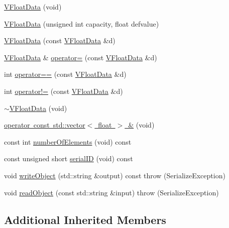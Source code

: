 \begin{DoxyCompactItemize}
\item 
\mbox{\hyperlink{classFILEDB_1_1VFloatData_a25f93b52c82fdc6299e386be3e251912}{V\+Float\+Data}} (void)
\item 
\mbox{\hyperlink{classFILEDB_1_1VFloatData_a27b94ed1e86096f64166bcd712b2ae94}{V\+Float\+Data}} (unsigned int capacity, float defvalue)
\item 
\mbox{\hyperlink{classFILEDB_1_1VFloatData_af51a333fc7a5e7aa94f75656efaa83c6}{V\+Float\+Data}} (const \mbox{\hyperlink{classFILEDB_1_1VFloatData}{V\+Float\+Data}} \&d)
\item 
\mbox{\hyperlink{classFILEDB_1_1VFloatData}{V\+Float\+Data}} \& \mbox{\hyperlink{classFILEDB_1_1VFloatData_a43bbec0ec343dacbbb69574c680cd22b}{operator=}} (const \mbox{\hyperlink{classFILEDB_1_1VFloatData}{V\+Float\+Data}} \&d)
\item 
int \mbox{\hyperlink{classFILEDB_1_1VFloatData_ac6cbdff5219aeabc1e182721ff9d6d7c}{operator==}} (const \mbox{\hyperlink{classFILEDB_1_1VFloatData}{V\+Float\+Data}} \&d)
\item 
int \mbox{\hyperlink{classFILEDB_1_1VFloatData_ab54605c8c5239fc22b85c4514ced5a24}{operator!=}} (const \mbox{\hyperlink{classFILEDB_1_1VFloatData}{V\+Float\+Data}} \&d)
\item 
\mbox{\hyperlink{classFILEDB_1_1VFloatData_a94f96be436999db58bfbff512cda6d63}{$\sim$\+V\+Float\+Data}} (void)
\item 
\mbox{\hyperlink{classFILEDB_1_1VFloatData_a9ac82e245522972ecb6667ec078336b5}{operator const std\+::vector$<$ float $>$ \&}} (void)
\item 
const int \mbox{\hyperlink{classFILEDB_1_1VFloatData_a1ef52e51516fd02fa123199c63cef647}{number\+Of\+Elements}} (void) const
\item 
const unsigned short \mbox{\hyperlink{classFILEDB_1_1VFloatData_a63b06bc5c69783fcbb4ab699b2633815}{serial\+ID}} (void) const
\item 
void \mbox{\hyperlink{classFILEDB_1_1VFloatData_afad9c7e520cdd7bf9ae0b477b8a5f1f1}{write\+Object}} (std\+::string \&output) const  throw (\+Serialize\+Exception)
\item 
void \mbox{\hyperlink{classFILEDB_1_1VFloatData_ae217975cba234df3601c065669f26f38}{read\+Object}} (const std\+::string \&input)  throw (\+Serialize\+Exception)
\end{DoxyCompactItemize}
\subsection*{Additional Inherited Members}


